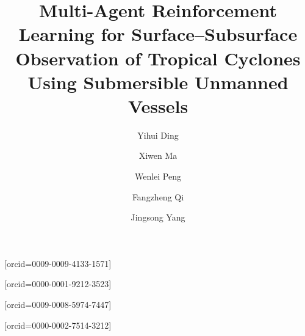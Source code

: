 \documentclass[a4paper,fleqn]{cas-dc}
\begin{document}
\let\WriteBookmarks\relax
\def\floatpagepagefraction{1}
\def\textpagefraction{.001}

\title [mode = title]{%
\texorpdfstring{Multi-Agent Reinforcement Learning for
Surface--Subsurface Observation of Tropical Cyclones Using Submersible
Unmanned Vessels}%
{Multi-Agent Reinforcement Learning for Surface--Subsurface Observation of
Tropical Cyclones Using Submersible Unmanned Vessels}}





\author[1,2]{Yihui Ding}[orcid=0009-0009-4133-1571]
\fnmark[1] %
\author[1,2,3]{\hspace*{0.33em}Xiwen Ma}[orcid=0000-0001-9212-3523]
\fnmark[1] %
\author[1,2]{\hspace*{0.33em}Wenlei Peng}
\author[1,2]{\hspace*{0.33em}Fangzheng Qi}[orcid=0009-0008-5974-7447]
\author[1,2,4]{\hspace*{0.33em}Jingsong Yang}[orcid=0000-0002-7514-3212]
\cormark[1]

\address[1]{School of Oceanography, Shanghai Jiao Tong University, Shanghai, 200030, China}
\address[2]{State Key Laboratory of Satellite Ocean Environment Dynamics, Second Institute of Oceanography, Ministry of Natural Resources, Hangzhou, 310012, China}
\address[3]{Institute of Automation Chinese Academy of Sciences, Beijing, 100190, China}
\address[4]{Southern Marine Science and Engineering Guangdong Laboratory (Zhuhai), Zhuhai, 519082, China}
\end{document}
